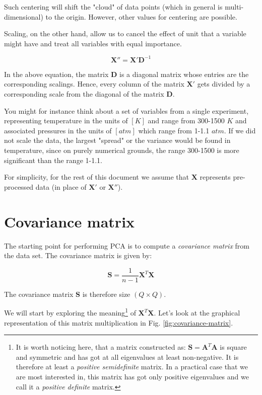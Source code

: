 \documentclass[10pt,twocolumn]{article}
\begin{document}
Such centering will shift the "cloud" of data points (which in general is multi-dimensional) to the origin. However, other values for centering are possible.

Scaling, on the other hand, allow us to cancel the effect of unit that a variable might have and treat all variables with equal importance. 

\begin{equation}
\bm{X''} = \bm{X'}\bm{D}^{-1}
\end{equation}

In the above equation, the matrix $\bm{D}$ is a diagonal matrix whose entries are the corresponding scalings. Hence, every column of the matrix $\bm{X'}$ gets divided by a corresponding scale from the diagonal of the matrix $\bm{D}$.

You might for instance think about a set of variables from a single experiment, representing temperature in the units of $[K]$ and range from 300-1500 $K$ and associated pressures in the units of $[atm]$ which range from 1-1.1 $atm$. If we did not scale the data, the largest "spread" or the variance would be found in temperature, since on purely numerical  grounds, the range 300-1500 is more significant than the range 1-1.1.

For simplicity, for the rest of this document we assume that $\bm{X}$ represents pre-processed data (in place of $\bm{X'}$ or $\bm{X''}$).

\section{Covariance matrix}

The starting point for performing PCA is to compute a \textit{covariance matrix} from the data set. The covariance matrix is given by:

\begin{equation}
\bm{S} = \frac{1}{n-1} \bm{X}^T \bm{X}
\end{equation}

The covariance matrix $\bm{S}$ is therefore size $(Q \times Q)$.

We will start by exploring the meaning\footnote{It is worth noticing here, that a matrix constructed as: $\bm{S} = \bm{A}^T \bm{A}$ is square and symmetric and has got at all eigenvalues at least non-negative. It is therefore at least a \textit{positive semidefinite} matrix. In a practical case that we are most interested in, this matrix has got only positive eigenvalues and we call it a \textit{positive definite} matrix.} of $\bm{X}^T \bm{X}$. Let's look at the graphical representation of this matrix multiplication in Fig. \ref{fig:covariance-matrix}.
\end{document}
